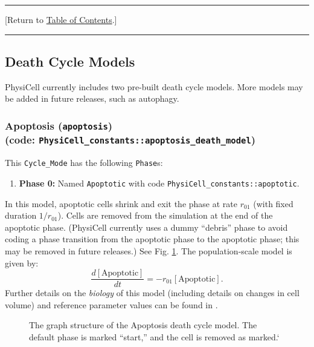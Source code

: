 \documentclass[12pt]{article}
\newcommand{\beq}{\begin{equation}}
\newcommand{\eeq}{\end{equation}}
\renewcommand{\v}{\verb}
\renewcommand{\t}[1]{\left[\mathrm{#1}\right]}
\newcommand{\TOClink}{\begin{center}\hrule\vskip-5pt\phantom{.}\hfill[Return to \hyperlink{TOC}{Table of Contents}.]\hfill\phantom{.}\vskip3pt\hrule\end{center}}
\begin{document}
\TOClink 









\subsection{Death Cycle Models}
\label{sec:Standard_Models:Death}
PhysiCell currently includes two pre-built death cycle models. More models 
may be added in future releases, such as autophagy. 

\subsubsection{Apoptosis (\texttt{apoptosis})\\
(code: \texttt{PhysiCell\_constants::apoptosis\_death\_model})}
\label{sec:Standard_Models:Apoptosis}
This \v|Cycle_Mode| has the following \v|Phase|s: 
\begin{enumerate}
\item 
\textbf{Phase 0:} Named \v|Apoptotic| with code \v|PhysiCell_constants::apoptotic|. 
\end{enumerate}
In this model, apoptotic cells shrink and exit the phase at 
rate $r_{01}$ (with fixed duration $1 / r_{01}$). Cells are removed 
from the simulation at the end of the apoptotic phase. 
(PhysiCell currently uses a dummy ``debris'' phase to avoid coding a 
phase transition from the apoptotic phase to the apoptotic phase; this 
may be removed in future releases.) 
See Fig. \ref{fig:death_model:apoptosis}. The 
population-scale model is given by: 
\beq
\frac{d\t{Apoptotic}}{dt} = -r_{01} \t{Apoptotic}. 
\eeq
Further details on the \emph{biology} of this model (including 
details on changes in cell volume) and reference parameter values can be found in \cite{ref:PhysiCell}. 

\begin{figure}
\begin{mdframed}[style=mystyle]
\caption{The graph structure of the Apoptosis death cycle model. The default phase is marked 
``start,'' and the cell is removed as marked.`}
\label{fig:death_model:apoptosis}
\end{mdframed}
\end{figure}
\end{document}
